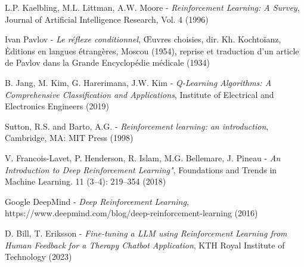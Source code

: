 \documentclass[french]{article}
\begin{document}
    \begin{thebibliography}{9}
    
    L.P. Kaelbling, M.L. Littman, A.W. Moore - \emph{Reinforcement Learning: A Survey}, Journal of Artificial Intelligence Research, Vol. 4 (1996)
    
    Ivan Pavlov - \emph{Le réflexe conditionnel}, Œuvres choisies, dir. Kh. Kochtoïanz, Ėditions en langues étrangères, Moscou (1954), reprise et traduction d’un article de Pavlov dans la Grande Encyclopédie médicale (1934)
    
    B. Jang, M. Kim, G. Harerimana, J.W. Kim - \emph{Q-Learning Algorithms: A Comprehensive Classification and Applications}, Institute of Electrical and Electronics Engineers (2019)

    Sutton, R.S. and Barto, A.G. - \emph{Reinforcement learning: an introduction}, Cambridge, MA: MIT Press (1998)

    V. Francois-Lavet, P. Henderson, R. Islam, M.G. Bellemare, J. Pineau - \emph{An Introduction to Deep Reinforcement Learning"}, Foundations and Trends in Machine Learning. 11 (3–4): 219–354 (2018)

    Google DeepMind - \emph{Deep Reinforcement Learning}, https://www.deepmind.com/blog/deep-reinforcement-learning (2016)

    D. Bill, T. Eriksson - \emph{Fine-tuning a LLM using Reinforcement Learning from Human Feedback for a Therapy Chatbot Application}, KTH Royal Institute of Technology (2023)
    \end{thebibliography}
\end{document}
